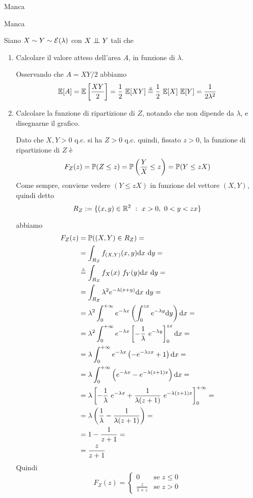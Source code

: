 \Soluzione{}
Manca

\Soluzione{}
Manca

\Soluzione{}
Siano $X\sim Y\sim\mathcal{E}(\lambda)$ con $X\indep Y$ tali che


\begin{enumerate}
\item Calcolare il valore atteso dell'area $A$, in funzione di $\lambda$.

Osservando che $A=XY/2$ abbiamo
\[
\EE[A]=\EE\left[ \frac{XY}{2} \right]=\frac{1}{2}\ \EE[XY]\overset{\underset{\indep}{}}{=}\frac{1}{2}\ \EE[X]\ \EE[Y]=\frac{1}{2\lambda^2}
\]

\item Calcolare la funzione di ripartizione di $Z$, notando che non dipende da $\lambda$, e disegnarne il grafico.

Dato che $X,Y>0$ q.c. si ha $Z>0$ q.c. quindi, fissato $z>0$, la funzione di ripartizione di $Z$ è
\[
F_Z(z)=\mathbb{P}(Z\leq z)=\mathbb{P}\left(\frac{Y}{X}\leq z \right)=\mathbb{P}(Y\leq zX)
\] 
Come sempre, conviene vedere $(Y\leq zX)$ in funzione del vettore $(X,Y)$, quindi detto
\[
R_Z:=\{(x,y)\in\RR^2\ :\ x>0,\ 0<y<zx\}
\]


abbiamo 
\begin{gather*}
\begin{aligned}
F_Z(z)&=\PP((X,Y)\in R_Z)= \\
&=\int_{R_Z}\fXYxy\dxy= \\
&\overset{\underset{\indep}{}}{=}\int_{R_Z}f_X(x)\ f_Y(y)\dxy=\\
&=\int_{R_Z}\lambda^2e^{-\lambda(x+y)}\dxy=\\
&=\lambda^2\int_{0}^{+\infty} e^{-\lambda x} \left( \int_0^{zx}e^{-\lambda y}\dy  \right)\dx=\\
&=\lambda^2\int_{0}^{+\infty} e^{-\lambda x} \left[-\frac{1}{\lambda}\ e^{-\lambda y}  \right]_0^{zx}\dx=\\
&=\lambda\int_{0}^{+\infty} e^{-\lambda x} \left( -e^{-\lambda zx}+1  \right)\dx=\\
&=\lambda\int_{0}^{+\infty} \left(e^{-\lambda x} -e^{-\lambda (z+1)x}  \right)\dx=\\
&=\lambda\left[-\frac{1}{\lambda}\ e^{-\lambda x}+\frac{1}{\lambda(z+1)}\ e^{-\lambda (z+1)x}  \right]_0^{+\infty}=\\
&=\lambda\left(\frac{1}{\lambda}-\frac{1}{\lambda(z+1)} \right)=\\
&=1-\frac{1}{z+1}=\\
&=\frac{z}{z+1}
\end{aligned}
\end{gather*}
Quindi
\[
F_Z(z)=
\begin{cases}
0 &\text{se }z\leq 0 \\
\displaystyle\frac{z}{1+z} &\text{se }z>0
\end{cases}
\]


\end{enumerate}

